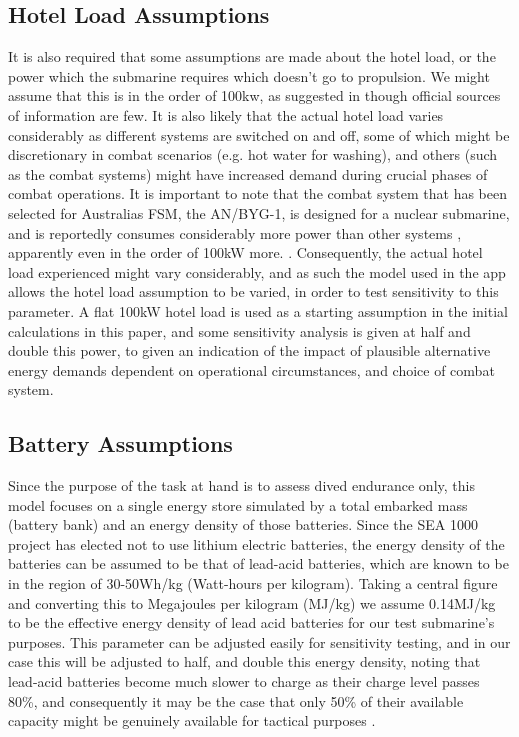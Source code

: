 \documentclass{article}\usepackage[]{graphicx}\usepackage[]{color}
\begin{document}
\subsection{Hotel Load Assumptions}
It is also required that some assumptions are made about the hotel load, or the power which the submarine requires which doesn't go to propulsion.  We might assume that this is in the order of 100kw, as suggested in \cite{martinez1995} though official sources of information are few.  It is also likely that the actual hotel load varies considerably as different systems are switched on and off, some of which might be discretionary in combat scenarios (e.g. hot water for washing), and others (such as the combat systems) might have increased demand during crucial phases of combat operations.  It is important to note that the combat system that has been selected for Australias FSM, the AN/BYG-1, is designed for a nuclear submarine, and is reportedly consumes considerably more power than other systems \cite{muir2015}, apparently even in the order of 100kW more. \cite{patrick2011}.  Consequently, the actual hotel load experienced might vary considerably, and as such the model used in the app allows the hotel load assumption to be varied, in order to test sensitivity to this parameter.  A flat 100kW hotel load is used as a starting assumption in the initial calculations in this paper, and some sensitivity analysis is given at half and double this power, to given an indication of the impact of plausible alternative energy demands dependent on operational circumstances, and choice of combat system.

\subsection{Battery Assumptions}
Since the purpose of the task at hand is to assess dived endurance only, this model focuses on a single energy store simulated by a total embarked mass (battery bank) and an energy density of those batteries.  Since the SEA 1000 project has elected not to use lithium electric batteries, the energy density of the batteries can be assumed to be that of lead-acid batteries, which are known to be in the region of 30-50Wh/kg (Watt-hours per kilogram).  Taking a central figure and converting this to Megajoules per kilogram (MJ/kg) we assume 0.14MJ/kg to be the effective energy density of lead acid batteries for our test submarine's purposes.  This parameter can be adjusted easily for sensitivity testing, and in our case this will be adjusted to half, and double this energy density, noting that lead-acid batteries become much slower to charge as their charge level passes 80\%, and consequently it may be the case that only 50\% of their available capacity might be genuinely available for tactical purposes \parencite{briggs2016}.
\end{document}
